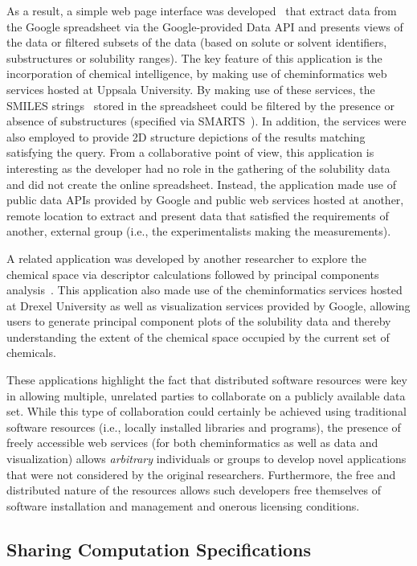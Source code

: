 \documentclass[11pt]{book}
\begin{document}
As a result, a simple web page interface was developed~\cite{url:onsgui}
that extract data from the Google spreadsheet via the
Google-provided Data API and presents views of the data or filtered subsets of
the data (based on solute or solvent identifiers, substructures or
solubility ranges). The key feature of this application is the
incorporation of chemical intelligence, by making use of
cheminformatics web services hosted at Uppsala University. By making
use of these services, the SMILES strings~\cite{Weininger1988} stored in the spreadsheet
could be filtered by the presence or absence of substructures
(specified via SMARTS~\cite{url:smarts}). In addition, the services were also employed
to provide 2D structure depictions of the results matching satisfying
the query. From a collaborative point of view, this application is
interesting as the developer had no role in the gathering of the
solubility data and did not create the online spreadsheet. Instead,
the application made use of public data APIs provided by Google and
public web services hosted at another, remote location to extract and
present data that satisfied the requirements of another, external
group (i.e., the experimentalists making the measurements).

A related application was developed by another researcher to
explore the chemical space via descriptor calculations followed by
principal components analysis~\cite{url:descriptorspace}.
This application also made use of the
cheminformatics services hosted at Drexel University as well as
visualization services provided by Google, allowing users to generate
principal component plots of the solubility data and thereby
understanding the extent of the chemical space occupied by the current
set of chemicals.

These applications highlight the fact that distributed software
resources were key in allowing multiple, unrelated parties to
collaborate on a publicly available data set. While this type of
collaboration could certainly be achieved using traditional software
resources (i.e., locally installed libraries and programs), the
presence of freely accessible web services (for both cheminformatics
as well as data and visualization) allows \emph{arbitrary} individuals
or groups to develop novel applications that were not considered by
the original researchers. Furthermore, the free and distributed nature
of the resources allows such developers free themselves of software
installation and management and onerous licensing conditions.


\subsection{Sharing Computation Specifications}
\end{document}
